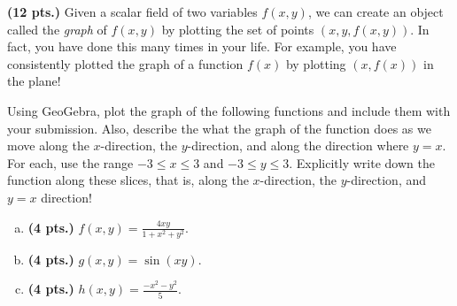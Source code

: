 \documentclass[12pt]{article} %
\begin{document}
\newpage
\begin{problem}
\textbf{(12 pts.)} Given a scalar field of two variables $f(x,y)$, we can create an object called the \emph{graph} of $f(x,y)$ by plotting the set of points $(x,y,f(x,y))$. In fact, you have done this many times in your life. For example, you have consistently plotted the graph of a function $f(x)$ by plotting $(x,f(x))$ in the plane!

Using GeoGebra, plot the graph of the following functions and include them with your submission.  Also, describe the what the graph of the function does as we move along the $x$-direction, the $y$-direction, and along the direction where $y=x$. For each, use the range $-3\leq x \leq 3$ and $-3\leq y \leq 3$. Explicitly write down the function along these slices, that is, along the $x$-direction, the $y$-direction, and $y=x$ direction!
\begin{enumerate}[(a)]
	\item \textbf{(4 pts.)} $f(x,y) = \frac{4xy}{1+x^2+y^2}$.
	\item \textbf{(4 pts.)} $g(x,y) = \sin(xy)$.
	\item \textbf{(4 pts.)} $h(x,y) = \frac{-x^2-y^2}{5}$.
\end{enumerate}
\end{problem}
\end{document}
